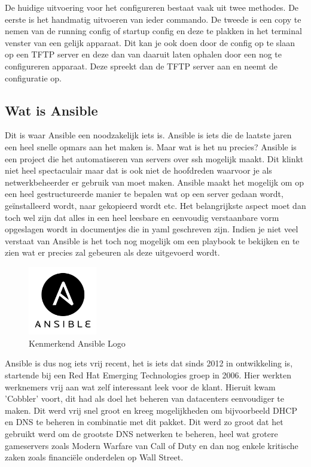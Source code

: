 De huidige uitvoering voor het configureren bestaat vaak uit twee methodes. De eerste is het handmatig uitvoeren van ieder commando. De tweede is een copy te nemen van de running config of startup config en deze te plakken in het terminal venster van een gelijk apparaat. Dit kan je ook doen door de config op te slaan op een TFTP server en deze dan van daaruit laten ophalen door een nog te configureren apparaat. Deze spreekt dan de TFTP server aan en neemt de configuratie op.

\subsection{Wat is Ansible}
\label{sec:whatisansible}

Dit is waar Ansible een noodzakelijk iets is. Ansible is iets die de laatste jaren een heel snelle opmars aan het maken is. Maar wat is het nu precies? Ansible is een project die het automatiseren van servers over ssh mogelijk maakt. Dit klinkt niet heel spectaculair maar dat is ook niet de hoofdreden waarvoor je als netwerkbeheerder er gebruik van moet maken. Ansible maakt het mogelijk om op een heel gestructureerde manier te bepalen wat op een server gedaan wordt, geïnstalleerd wordt, naar gekopieerd wordt etc. Het belangrijkste aspect moet dan toch wel zijn dat alles in een heel leesbare en eenvoudig verstaanbare vorm opgeslagen wordt in documentjes die in yaml geschreven zijn. Indien je niet veel verstaat van Ansible is het toch nog mogelijk om een playbook te bekijken en te zien wat er precies zal gebeuren als deze uitgevoerd wordt.
\begin{figure}[H]
\centering
\includegraphics[width=3cm]{../img/ansiblelogo}
\caption{Kenmerkend Ansible Logo}
\end{figure} 
Ansible is dus nog iets vrij recent, het is iets dat sinds 2012 in ontwikkeling is, startende bij een Red Hat Emerging Technologies groep in 2006. Hier werkten werknemers vrij aan wat zelf interessant leek voor de klant. Hieruit kwam 'Cobbler' voort, dit had als doel het beheren van datacenters eenvoudiger te maken.  Dit werd vrij snel groot en kreeg mogelijkheden om bijvoorbeeld DHCP en DNS te beheren in combinatie met dit pakket. Dit werd zo groot dat het gebruikt werd om de grootste DNS netwerken te beheren, heel wat grotere gameservers zoals Modern Warfare van Call of Duty en dan nog enkele kritische zaken zoals financiële onderdelen op Wall Street. 
\\

